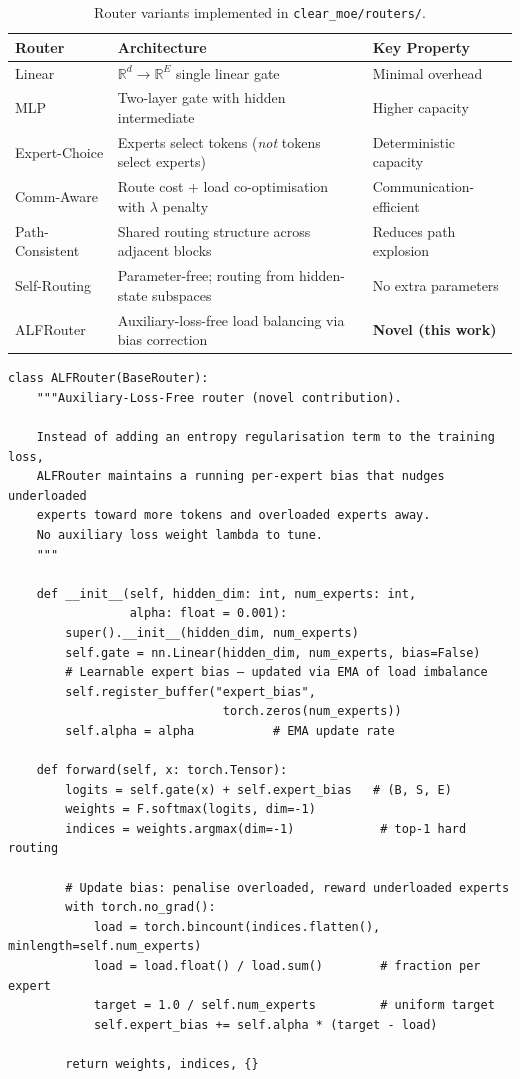 \documentclass[12pt,a4paper]{article}
\begin{document}
\begin{table}[H]
\centering
\caption{Router variants implemented in \texttt{clear\_moe/routers/}.}
\label{tab:routers}
\begin{tabular}{lll}
\toprule
\textbf{Router} & \textbf{Architecture} & \textbf{Key Property} \\
\midrule
Linear          & $\mathbb{R}^d \to \mathbb{R}^E$ single linear gate & Minimal overhead \\
MLP             & Two-layer gate with hidden intermediate & Higher capacity \\
Expert-Choice   & Experts select tokens (\textit{not} tokens select experts) & Deterministic capacity \\
Comm-Aware      & Route cost + load co-optimisation with $\lambda$ penalty & Communication-efficient \\
Path-Consistent & Shared routing structure across adjacent blocks & Reduces path explosion \\
Self-Routing    & Parameter-free; routing from hidden-state subspaces & No extra parameters \\
ALFRouter       & Auxiliary-loss-free load balancing via bias correction & \textbf{Novel (this work)} \\
\bottomrule
\end{tabular}
\end{table}

\begin{lstlisting}[caption={ALFRouter: auxiliary-loss-free load balancing (excerpt from \texttt{clear\_moe/routers/alf\_router.py}).},label={lst:alfrouter}]
class ALFRouter(BaseRouter):
    """Auxiliary-Loss-Free router (novel contribution).

    Instead of adding an entropy regularisation term to the training loss,
    ALFRouter maintains a running per-expert bias that nudges underloaded
    experts toward more tokens and overloaded experts away.
    No auxiliary loss weight lambda to tune.
    """

    def __init__(self, hidden_dim: int, num_experts: int,
                 alpha: float = 0.001):
        super().__init__(hidden_dim, num_experts)
        self.gate = nn.Linear(hidden_dim, num_experts, bias=False)
        # Learnable expert bias — updated via EMA of load imbalance
        self.register_buffer("expert_bias",
                              torch.zeros(num_experts))
        self.alpha = alpha           # EMA update rate

    def forward(self, x: torch.Tensor):
        logits = self.gate(x) + self.expert_bias   # (B, S, E)
        weights = F.softmax(logits, dim=-1)
        indices = weights.argmax(dim=-1)            # top-1 hard routing

        # Update bias: penalise overloaded, reward underloaded experts
        with torch.no_grad():
            load = torch.bincount(indices.flatten(), minlength=self.num_experts)
            load = load.float() / load.sum()        # fraction per expert
            target = 1.0 / self.num_experts         # uniform target
            self.expert_bias += self.alpha * (target - load)

        return weights, indices, {}
\end{lstlisting}
\end{document}
